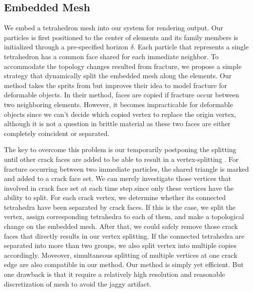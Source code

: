 \subsection{Embedded Mesh}
We embed a tetrahedron mesh into our system for rendering output.
Our particles is first positioned to the center of elements and its family members is initialized through a pre-specified horizon $\delta$.
Each particle that represents a single tetrahedron has a common face shared for each immediate neighbor.
To accommodate the topology changes resulted from fracture, we propose a simple strategy that dynamically split the embedded mesh along the elements.
Our method takes the sprits from \cite{Chen2013} but improves their idea to model fracture for deformable objects.
In their method, faces are copied if fracture occur between two neighboring elements.
However, it becomes impracticable for deformable objects since we can't decide which copied vertex to replace the origin vertex,
although it is not a question in brittle material as these two faces are either completely coincident or separated.

The key to overcome this problem is our temporarily postponing the splitting until other crack faces are added to be able to result in a vertex-splitting .
For fracture occurring between two immediate particles, the shared triangle is marked and added to a crack face set.
We can merely investigate those vertices that involved in crack face set at each time step since only these vertices have the ability to split.
For each crack vertex, we determine whether its connected tetrahedra have been separated by crack faces.
If this is the case, we split the vertex, assign corresponding tetrahedra to each of them, and make a topological change on the embedded mesh.
After that, we could safely remove those crack faces that directly results in our vertex splitting.
If the connected tetrahedra are separated into more than two groups, we also split vertex into multiple copies accordingly.
Moveover, simultaneous splitting of multiple vertices at one crack edge are also compatible in our method.
Our method is simply yet efficient.
But one drawback is that it require a relatively high resolution and reasonable discretization of mesh to avoid the jaggy artifact.


